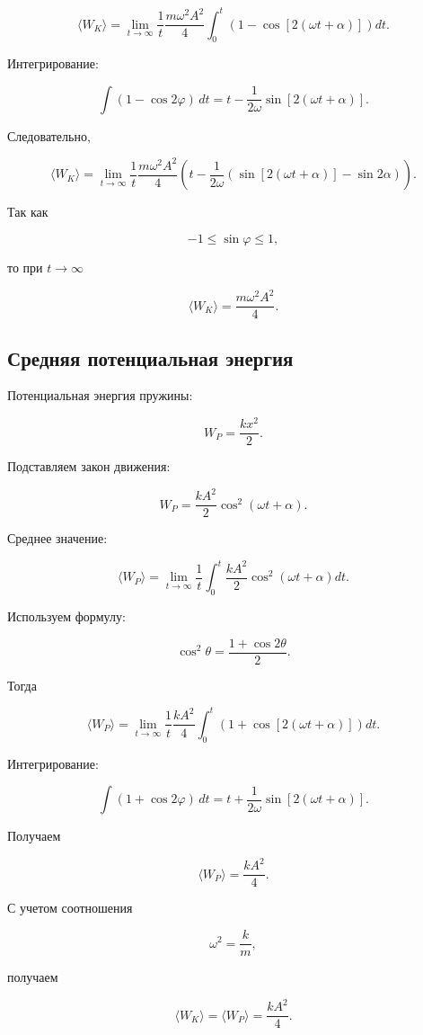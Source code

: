 \documentclass[a4paper,12pt]{article}
\begin{document}
\[
\langle W_K \rangle
=
\lim_{t \to \infty}
\frac{1}{t}
\frac{m \omega^2 A^2}{4}
\int_0^t
\left(
1 - \cos[2(\omega t + \alpha)]
\right)
dt.
\]

Интегрирование:

\[
\int (1 - \cos 2\varphi)\,dt
=
t
-
\frac{1}{2\omega}
\sin[2(\omega t + \alpha)].
\]

Следовательно,

\[
\langle W_K \rangle
=
\lim_{t \to \infty}
\frac{1}{t}
\frac{m \omega^2 A^2}{4}
\left(
t
-
\frac{1}{2\omega}
(
\sin[2(\omega t + \alpha)]
-
\sin 2\alpha
)
\right).
\]

Так как

\[
-1 \le \sin \varphi \le 1,
\]

то при $t \to \infty$

\[
\langle W_K \rangle
=
\frac{m \omega^2 A^2}{4}.
\]

\subsection*{Средняя потенциальная энергия}

Потенциальная энергия пружины:

\[
W_P
=
\frac{k x^2}{2}.
\]

Подставляем закон движения:

\[
W_P
=
\frac{k A^2}{2}
\cos^2(\omega t + \alpha).
\]

Среднее значение:

\[
\langle W_P \rangle
=
\lim_{t \to \infty}
\frac{1}{t}
\int_0^t
\frac{k A^2}{2}
\cos^2(\omega t + \alpha)
dt.
\]

Используем формулу:

\[
\cos^2 \theta
=
\frac{1 + \cos 2\theta}{2}.
\]

Тогда

\[
\langle W_P \rangle
=
\lim_{t \to \infty}
\frac{1}{t}
\frac{k A^2}{4}
\int_0^t
\left(
1 + \cos[2(\omega t + \alpha)]
\right)
dt.
\]

Интегрирование:

\[
\int (1 + \cos 2\varphi)\,dt
=
t
+
\frac{1}{2\omega}
\sin[2(\omega t + \alpha)].
\]

Получаем

\[
\langle W_P \rangle
=
\frac{k A^2}{4}.
\]

С учетом соотношения

\[
\omega^2
=
\frac{k}{m},
\]

получаем

\[
\langle W_K \rangle
=
\langle W_P \rangle
=
\frac{k A^2}{4}.
\]
\end{document}

